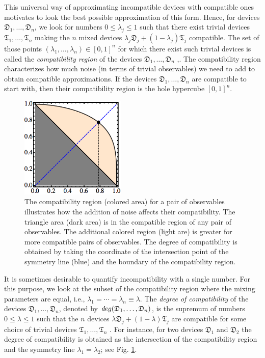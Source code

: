 \documentclass[12pt]{article}
\theoremstyle{definition}
\newcommand{\Dev}{\mathfrak{D}} %
\newcommand{\Triv}{\mathfrak{T}} %
\def\deg{\textit deg}
\begin{document}
This universal way of approximating incompatible devices with compatible ones motivates to look the best possible approximation of this form. 
Hence, for devices $\Dev_1,\ldots,\Dev_n$, we look for numbers $0\leq \lambda_j \leq 1$ such that there exist trivial devices $\Triv_1,\ldots,\Triv_n$ making the $n$ mixed devices 
$\lambda_j \Dev_j + (1-\lambda_j) \Triv_j$ compatible. 
The set of those points $(\lambda_1,\ldots,\lambda_n)\in [0,1]^n$ for which there exist such trivial devices is called the \emph{compatibility region} of the devices $\Dev_1,\ldots,\Dev_n$ \cite{BuHeScSt13},\cite{Gudder13}.
The compatibility region characterizes how much noise (in terms of trivial observables) we need to add to obtain compatible approximations.
If the devices $\Dev_1,\ldots,\Dev_n$ are compatible to start with, then their compatibility region is the hole hypercube $[0,1]^n$.

\begin{figure}\begin{center}
\includegraphics[width=5cm]{fig_region.png}
\caption{The compatibility region (colored area) for a pair of observables illustrates how the addition of noise affects their compatibility. The triangle area (dark area) is in the compatible region of any pair of observables. 
The additional colored region (light are) is greater for more compatible pairs of observables. 
The degree of compatibility is obtained by taking the coordinate of the intersection point of the symmetry line (blue) and the boundary of the compatibility region.}
\label{fig:degree}
\end{center}
\end{figure}

It is sometimes desirable to quantify incompatibility with a single number.
For this purpose, we look at the subset of the compatibility region where the mixing parameters are equal, i.e.,  $\lambda_1=\cdots =\lambda_n \equiv\lambda$.
The \emph{degree of compatibility} of the devices $\Dev_1,\ldots,\Dev_n$, denoted by $\deg(\Dev_1,\ldots,\Dev_n)$, is the supremum of numbers $0\leq \lambda \leq 1$ such that the $n$ devices 
$\lambda \Dev_j + (1-\lambda) \Triv_j$ are compatible for some choice of trivial devices $\Triv_1,\ldots,\Triv_n$ \cite{HeScToZi14}.
For instance, for two devices $\Dev_1$ and $\Dev_2$ the degree of compatibility is obtained as the intersection of the compatibility region and the symmetry line $\lambda_1=\lambda_2$; see Fig. \ref{fig:degree}. 
\end{document}
